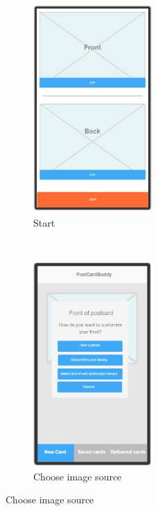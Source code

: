 \documentclass[10pt,a4paper]{article}
\begin{document}
\begin{figure}[p]
	\centering
	\begin{subfigure}{0.5\textwidth}
		\centering
		\includegraphics[width=0.5\textwidth]{Prototype_img/p1.png}
		\caption{Start}
		\label{fig:p1}
	\end{subfigure}~
	\begin{subfigure}{0.5\textwidth}
		\centering
		\includegraphics[width=0.5\textwidth]{Prototype_img/p2.png}
		\caption{Choose image source}

\end{subfigure}
\end{figure}
\end{document}
